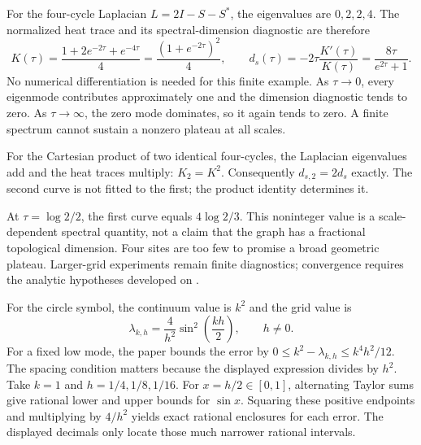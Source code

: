 For the four-cycle Laplacian $L=2I-S-S^*$, the eigenvalues are $0,2,2,4$. The normalized heat trace and its spectral-dimension diagnostic are therefore
\[
K(\tau)=\frac{1+2e^{-2\tau}+e^{-4\tau}}4
=\frac{(1+e^{-2\tau})^2}4,
\qquad
 d_s(\tau)=-2\tau\frac{K'(\tau)}{K(\tau)}
=\frac{8\tau}{e^{2\tau}+1}.
\]
No numerical differentiation is needed for this finite example.
As $\tau\to0$, every eigenmode contributes approximately one and the dimension diagnostic tends to zero. As $\tau\to\infty$, the zero mode dominates, so it again tends to zero. A finite spectrum cannot sustain a nonzero plateau at all scales.

For the Cartesian product of two identical four-cycles, the Laplacian eigenvalues add and the heat traces multiply: $K_2=K^2$. Consequently $d_{s,2}=2d_s$ exactly. The second curve is not fitted to the first; the product identity determines it.

At $\tau=\log2/2$, the first curve equals $4\log2/3$. This noninteger value is a scale-dependent spectral quantity, not a claim that the graph has a fractional topological dimension. Four sites are too few to promise a broad geometric plateau. Larger-grid experiments remain finite diagnostics; convergence requires the analytic hypotheses developed on .

For the circle symbol, the continuum value is $k^2$ and the grid value is
\[
\lambda_{k,h}=\frac4{h^2}\sin^2\!\left(\frac{kh}{2}\right),\qquad h\ne0.
\]
For a fixed low mode, the paper bounds the error by $0\le k^2-\lambda_{k,h}\le k^4h^2/12$. The spacing condition matters because the displayed expression divides by $h^2$.
Take $k=1$ and $h=1/4,1/8,1/16$. For $x=h/2\in[0,1]$, alternating Taylor sums give rational lower and upper bounds for $\sin x$. Squaring these positive endpoints and multiplying by $4/h^2$ yields exact rational enclosures for each error. The displayed decimals only locate those much narrower rational intervals.

